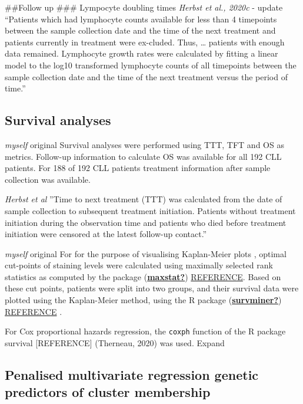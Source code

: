 \documentclass[11pt, a4paper, twosided]{book}
\begin{document}
\#\#Follow up
\#\#\# Lympocyte doubling times
\emph{Herbst et al., 2020c} - update
``Patients which had lymphocyte counts available for less than 4 timepoints between the sample
collection date and the time of the next treatment and patients currently in treatment were ex-cluded. Thus, \ldots{} patients with enough data remained. Lymphocyte growth rates were calculated by fitting a linear model to the log10 transformed lymphocyte counts of all timepoints between the sample collection date and the time of the next treatment versus the period of time.''

\hypertarget{survival-analyses}{%
\subsection{Survival analyses}\label{survival-analyses}}

\emph{myself} original
Survival analyses were performed using TTT, TFT and OS as metrics. Follow-up information to calculate OS was available for all 192 CLL patients. For 188 of 192 CLL patients treatment information after sample collection was available.

\emph{Herbst et al}
''Time to next treatment (TTT) was calculated from the date of sample collection to subsequent
treatment initiation. Patients without treatment initiation during the observation time and
patients who died before treatment initiation were censored at the latest follow-up contact.''

\emph{myself} original
For for the purpose of visualising Kaplan-Meier plots , optimal cut-points of staining levels were calculated using maximally selected rank statistics as computed by the package (\protect\hyperlink{ref-maxstat}{\textbf{maxstat?}}) \href{Hothorn,2017}{REFERENCE}. Based on these cut points, patients were split into two groups, and their survival data were plotted using the Kaplan-Meier method, using the R package (\protect\hyperlink{ref-survminer}{\textbf{survminer?}}) \href{Kassambara\%20et\%20al.,\%202019}{REFERENCE} .

For Cox proportional hazards regression, the \texttt{coxph} function of the R package survival {[}REFERENCE{]} (Therneau, 2020) was used. Expand

\hypertarget{penalised-multivariate-regression-genetic-predictors-of-cluster-membership}{%
\subsection{Penalised multivariate regression genetic predictors of cluster membership}\label{penalised-multivariate-regression-genetic-predictors-of-cluster-membership}}
\end{document}
